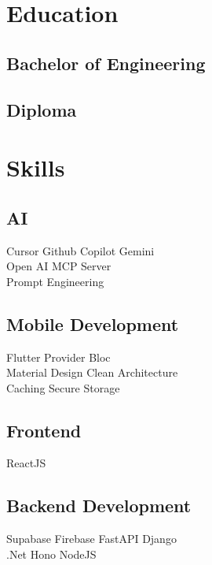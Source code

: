 \documentclass[]{deedy-resume-reversed}
\begin{document}
\begin{minipage}[t]{0.33\textwidth}

\section{Education}

\subsection{Bachelor of Engineering}
\sectionsep

\subsection{Diploma}
\sectionsep

\section{Skills}

\subsection{AI}
Cursor \textbullet Github Copilot \textbullet Gemini\\
Open AI \textbullet MCP Server \\
Prompt Engineering 
\sectionsep

\subsection{Mobile Development}
Flutter \textbullet Provider \textbullet Bloc \\
Material Design \textbullet Clean Architecture \\
Caching \textbullet Secure Storage \\
\sectionsep

\subsection{Frontend}
ReactJS \\
\sectionsep

\subsection{Backend Development}
Supabase \textbullet Firebase \textbullet FastAPI \textbullet Django \\
.Net \textbullet Hono \textbullet NodeJS \\
\sectionsep


\end{minipage}
\end{document}
